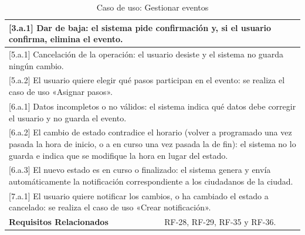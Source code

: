 \begin{table}[h!]
\begin{tabular}{|p{4cm}|p{11cm}|}
        \hline
        \multicolumn{2}{|p{15cm}|}{ [3.a.1] Dar de baja: el sistema pide confirmación y, si el usuario confirma, elimina el evento. } \\
        \hline
        \multicolumn{2}{|p{15cm}|}{ [5.a.1] Cancelación de la operación: el usuario desiste y el sistema no guarda ningún cambio. } \\
        \hline
        \multicolumn{2}{|p{15cm}|}{ [5.a.2] El usuario quiere elegir qué pasos participan en el evento: se realiza el caso de uso «Asignar pasos». } \\
        \hline
        \multicolumn{2}{|p{15cm}|}{ [6.a.1] Datos incompletos o no válidos: el sistema indica qué datos debe corregir el usuario y no guarda el evento. } \\
        \hline
        \multicolumn{2}{|p{15cm}|}{ [6.a.2] El cambio de estado contradice el horario (volver a programado una vez pasada la hora de inicio, o a en curso una vez pasada la de fin): el sistema no lo guarda e indica que se modifique la hora en lugar del estado. } \\
        \hline
        \multicolumn{2}{|p{15cm}|}{ [6.a.3] El nuevo estado es en curso o finalizado: el sistema genera y envía automáticamente la notificación correspondiente a los ciudadanos de la ciudad. } \\
        \hline
        \multicolumn{2}{|p{15cm}|}{ [7.a.1] El usuario quiere notificar los cambios, o ha cambiado el estado a cancelado: se realiza el caso de uso «Crear notificación». } \\
        \hline
        \textbf{Requisitos Relacionados} & RF-28, RF-29, RF-35 y RF-36. \\
        \hline
    \end{tabular}
    \caption{Caso de uso: Gestionar eventos}
\end{table}

